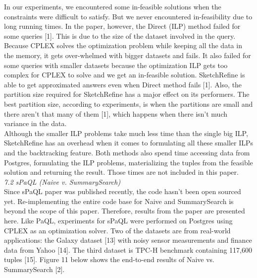 \documentclass[a4paper,12pt]{article}
\begin{document}
In our experiments, we encountered some in-feasible solutions when the constraints were difficult to satisfy. But we never encountered in-feasibility due to long running times. In the paper, however, the Direct (ILP) method failed for some queries [1]. This is due to the size of the dataset involved in the query. Because CPLEX solves the optimization problem while keeping all the data in the memory, it gets over-whelmed with bigger datasets and fails. It also failed for some queries with smaller datasets because the optimization ILP gets too complex for CPLEX to solve and we get an in-feasible solution. SketchRefine is able to get approximated answers even when Direct method fails [1]. Also, the partition size required for SketchRefine has a major effect on its performers. The best partition size, according to experiments, is when the partitions are small and there aren't that many of them [1], which happens when there isn't much variance in the data.
\\

Although the smaller ILP problems take much less time than the single big ILP, SketchRefine has an overhead when it comes to formulating all these smaller ILPs and the backtracking feature. Both methods also spend time accessing data from Postgres, formulating the ILP problems, materializing the tuples from the feasible solution and returning the result. Those times are not included in this paper.
\\

\textit{7.2 sPaQL (Naive v. SummarySearch)}
\\

Since sPaQL paper was published recently, the code hasn't been open sourced yet. Re-implementing the entire code base for Naive and SummarySearch is beyond the scope of this paper. Therefore, results from the paper are presented here. Like PaQL, experiments for sPaQL were performed on Postgres using CPLEX as an optimization solver. Two of the datasets are from real-world applications: the Galaxy dataset [13] with noisy sensor measurements and finance data from Yahoo [14]. The third dataset is TPC-H benchmark containing 117,600 tuples [15].  Figure 11 below shows the end-to-end results of Naive vs. SummarySearch [2]. 
\\
\end{document}
